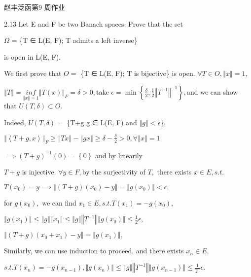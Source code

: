 \documentclass{article}
\begin{document}
\bigskip 赵丰\qquad 泛函第9%
周作业

2.13 Let E and F be two Banach spaces. Prove that the set

$\Omega $ = \{T ∈ L(E, F); T admits a left inverse\}

is open in L(E, F).

\bigskip We first prove that $O=$ \{T ∈ L(E, F); T is bijective\} is
open. $\forall T\in O,\left\Vert x\right\Vert =1,$

$\left\Vert T\right\Vert =\underset{\left\Vert x\right\Vert =1}{inf}%
\left\Vert T\left( x\right) \right\Vert _{F}=\delta >0,$take $\epsilon =\min
\left\{ \frac{\delta }{2},\frac{1}{2}\left\Vert T^{-1}\right\Vert
^{-1}\right\} ,$and we can show that $U\left( T,\delta \right) \subset O.$

Indeed, $U\left( T,\delta \right) =$ \{T+g \TEXTsymbol{\vert}g ∈ L(E,
F) and $\left\Vert g\right\Vert <\epsilon $\},

$\left\Vert \left\langle T+g,x\right\rangle \right\Vert _{F}\geq \left\Vert
Tx\right\Vert -\left\Vert gx\right\Vert \geq \delta -\frac{\delta }{2}%
>0,\forall \left\Vert x\right\Vert =1$

$\implies \left( T+g\right) ^{-1}\left( 0\right) =\left\{ 0\right\} $ and by
linearily 

$T+g$ is injective. $\forall y\in F,$by the surjectivity of $T,$ there
exists $x\in E,s.t.$

$T\left( x_{0}\right) =y\implies \left\Vert \left( T+g\right) \left(
x_{0}\right) -y\right\Vert =\left\Vert g\left( x_{0}\right) \right\Vert
<\epsilon ,$

for $g\left( x_{0}\right) ,$ we can find $x_{1}\in E,s.t.T\left(
x_{1}\right) =-g\left( x_{0}\right) ,$

$\left\Vert g\left( x_{1}\right) \right\Vert \leq \left\Vert g\right\Vert
\left\Vert x_{1}\right\Vert \leq \left\Vert g\right\Vert \left\Vert
T^{-1}\right\Vert \left\Vert g\left( x_{0}\right) \right\Vert \leq \frac{1}{2%
}\epsilon ,$

$\left\Vert \left( T+g\right) \left( x_{0}+x_{1}\right) -y\right\Vert
=\left\Vert g\left( x_{1}\right) \right\Vert ,$

Similarly, we can use induction to proceed, and there exists $x_{n}\in E,$

$s.t.T\left( x_{n}\right) =-g\left( x_{n-1}\right) ,\left\Vert g\left(
x_{n}\right) \right\Vert \leq \left\Vert g\right\Vert \left\Vert
T^{-1}\right\Vert \left\Vert g\left( x_{n-1}\right) \right\Vert \leq \frac{1%
}{2^{n}}\epsilon .$
\end{document}
